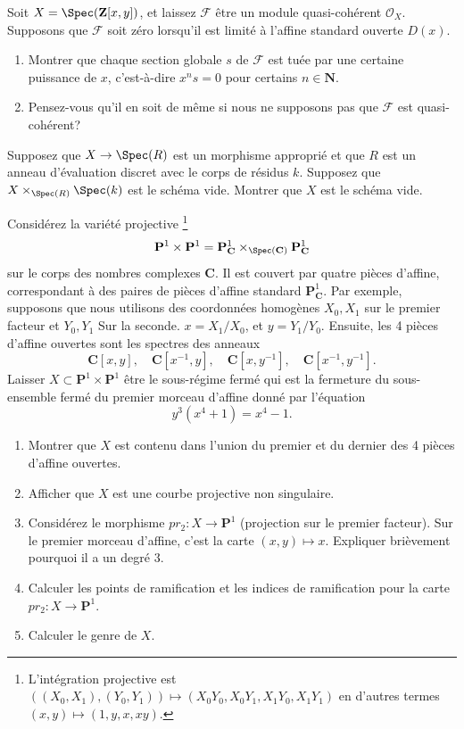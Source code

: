 \begin{exercise}
\label{exercise-kill-global-sections}
Soit $X = \Spec({\mathbf Z}[x, y])$, et laissez ${\mathcal F}$
être un
module quasi-cohérent ${\mathcal O}_X$. Supposons que ${\mathcal F}$ soit zéro lorsqu'il est limité
à
l'affine standard ouverte $D(x)$.
\begin{enumerate}
\item Montrer que chaque section globale $s$ de ${\mathcal F}$ est tuée par une certaine
puissance de $x$, c'est-à-dire $x^ns = 0$ pour certains $n\in {\mathbf N}$.
\item Pensez-vous qu'il en soit de même si nous ne supposons pas que ${\mathcal
F}$ est quasi-cohérent?
\end{enumerate}
\end{exercise}

\begin{exercise}
\label{exercise-empty-fibre-empty}
Supposez que $X \to \Spec(R)$ est un morphisme approprié et que
$R$ est un anneau d'évaluation discret avec le corps de résidus $k$.
Supposez que $X \times_{\Spec(R)} \Spec(k)$ est le schéma vide. Montrer que $X$
est le schéma vide.
\end{exercise}

\begin{exercise}
\label{exercise-curve-p1-p1}
Considérez la
variété projective \footnote{L'intégration projective est $((X_0,
X_1), (Y_0, Y_1))\mapsto (X_0Y_0, X_0Y_1, X_1Y_0, X_1Y_1)$ en d'autres
termes $(x, y)\mapsto (1, y, x, xy)$.}
$$
{\mathbf P}^1 \times {\mathbf P}^1 = {\mathbf P}^1_{{\mathbf C}}
\times_{\Spec({\mathbf C})} {\mathbf P}^1_{\mathbf C}
$$
sur le corps des nombres complexes ${\mathbf C}$. Il est couvert par quatre
pièces d'affine,
correspondant à des paires de pièces d'affine standard ${\mathbf P}^1_{\mathbf C}$. Par exemple,
supposons que nous
utilisons des coordonnées homogènes $X_0, X_1$ sur le premier facteur et $Y_0, Y_1$
Sur la seconde. $x = X_1/X_0$, et $y = Y_1/Y_0$. Ensuite, les 4
pièces d'affine ouvertes sont les spectres des anneaux
$$
{\mathbf C}[x, y], \quad
{\mathbf C}[x^{-1}, y], \quad
{\mathbf C}[x, y^{-1}], \quad
{\mathbf C}[x^{-1}, y^{-1}].
$$
Laisser $X \subset {\mathbf P}^1 \times {\mathbf P}^1$ être le sous-régime fermé
qui est
la fermeture du sous-ensemble fermé du premier morceau d'affine donné par l'équation
$$
y^3(x^4 + 1) = x^4 -1.
$$
\begin{enumerate}
\item Montrer que $X$ est contenu dans l'union du premier et
du dernier des 4 pièces d'affine ouvertes.
\item Afficher que $X$ est une courbe projective non singulaire.
\item Considérez le morphisme $pr_2 : X \to {\mathbf P}^1$ (projection sur le premier
facteur). Sur le premier morceau d'affine, c'est la carte $(x, y) \mapsto x$. Expliquer
brièvement pourquoi il a un degré $3$.
\item Calculer les points de ramification et les indices de ramification pour
la carte $pr_2 : X \to {\mathbf P}^1$.
\item Calculer le genre de $X$.
\end{enumerate}
\end{exercise}

